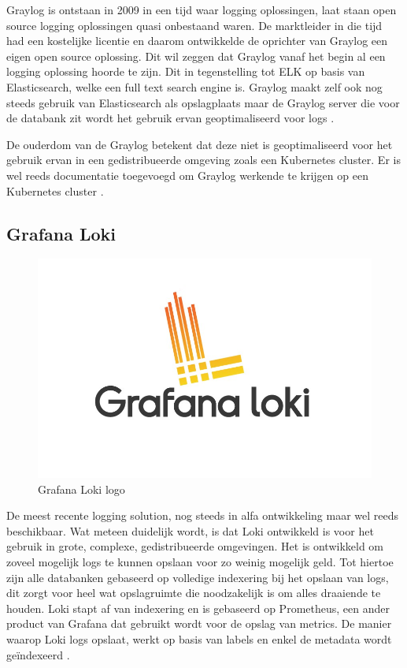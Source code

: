 Graylog is ontstaan in 2009 in een tijd waar logging oplossingen, laat staan open source logging oplossingen quasi onbestaand waren. De marktleider in die tijd had een kostelijke licentie en daarom ontwikkelde de oprichter van Graylog een eigen open source oplossing. Dit wil zeggen dat Graylog vanaf het begin al een logging oplossing hoorde te zijn. Dit in tegenstelling tot ELK op basis van Elasticsearch, welke een full text search engine is. Graylog maakt zelf ook nog steeds gebruik van Elasticsearch als opslagplaats maar de Graylog server die voor de databank zit wordt het gebruik ervan geoptimaliseerd voor logs \autocite{graylog}.

De ouderdom van de Graylog betekent dat deze niet is geoptimaliseerd voor het gebruik ervan in een gedistribueerde omgeving zoals een Kubernetes cluster. Er is wel reeds documentatie toegevoegd om Graylog werkende te krijgen op een Kubernetes cluster \autocite{lumiq2017}.  

\subsection{Grafana Loki}

\begin{figure}[ht]
    \centering
    \includegraphics[scale=0.4]{img/loki}
    \caption[Grafana Loki logo]{Grafana Loki logo \cite{loki}}
\end{figure}

De meest recente logging solution, nog steeds in alfa ontwikkeling maar wel reeds beschikbaar. Wat meteen duidelijk wordt, is dat Loki ontwikkeld is voor het gebruik in grote, complexe, gedistribueerde omgevingen. Het is ontwikkeld om zoveel mogelijk logs te kunnen opslaan voor zo weinig mogelijk geld. Tot hiertoe zijn alle databanken gebaseerd op volledige indexering bij het opslaan van logs, dit zorgt voor heel wat opslagruimte die noodzakelijk is om alles draaiende te houden. Loki stapt af van indexering en is gebaseerd op Prometheus, een ander product van Grafana dat gebruikt wordt voor de opslag van metrics. De manier waarop Loki logs opslaat, werkt op basis van labels en enkel de metadata wordt geïndexeerd \autocite{oleksii2019}.

